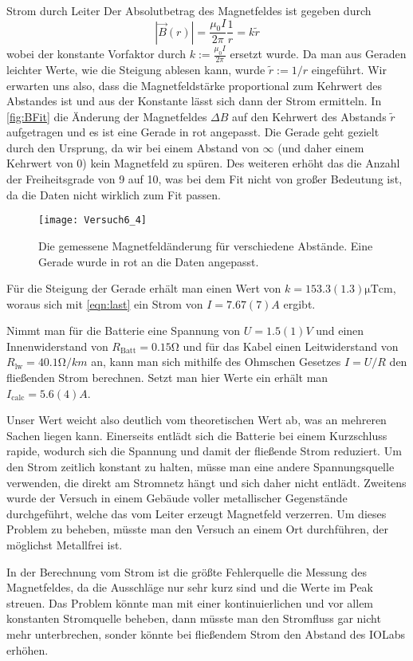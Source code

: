 \documentclass{alex_gp}
\begin{document}
\begin{mybox}{Strom durch Leiter}
	Der Absolutbetrag des Magnetfeldes ist gegeben durch 
	\begin{equation}\label{eqn:last}
		|\vec{B}(r)| = \frac{\mu_0 I}{2\pi}\frac{1}{r} = k\tilde{r}
	\end{equation}
	wobei der konstante Vorfaktor durch \( k := \tfrac{\mu_0 I}{2\pi} \) ersetzt wurde. Da man aus Geraden leichter Werte, wie die Steigung ablesen kann, wurde \( \tilde{r} := 1/r \) eingeführt. Wir erwarten uns also, dass die Magnetfeldstärke proportional zum Kehrwert des Abstandes ist und aus der Konstante lässt sich dann der Strom ermitteln. In \autoref{fig:BFit} die Änderung der Magnetfeldes \( \Delta B \) auf den Kehrwert des Abstands \( \tilde{r} \) aufgetragen und es ist eine Gerade in rot angepasst. Die Gerade geht gezielt durch den Ursprung, da wir bei einem Abstand von \( \infty \) (und daher einem Kehrwert von 0) kein Magnetfeld zu spüren. Des weiteren erhöht das die Anzahl der Freiheitsgrade von 9 auf 10, was bei dem Fit nicht von großer Bedeutung ist, da die Daten nicht wirklich zum Fit passen. 
	
	\begin{figure}[H]	
		\centering
		\texttt{[image: Versuch6\_4]}
		\caption{Die gemessene Magnetfeldänderung für verschiedene Abstände. Eine Gerade wurde in rot an die Daten angepasst.}
		\label{fig:BFit}
	\end{figure}

	Für die Steigung der Gerade erhält man einen Wert von \( k = 153.3(1.3) \unit{\micro\tesla\cm} \), woraus sich mit \autoref{eqn:last} ein Strom von \( I = 7.67(7) \unit{A} \) ergibt.
	
	Nimmt man für die Batterie eine Spannung von \( U = 1.5(1) \unit{V} \) und einen Innenwiderstand von \( R_{\text{Batt}} = 0.15 \unit{\ohm} \) und für das Kabel einen Leitwiderstand von \( R_{\text{lw}} = 40.1 \unit{\ohm/km} \) an, kann man sich mithilfe des Ohmschen Gesetzes \( I = U/R \) den fließenden Strom berechnen. Setzt man hier Werte ein erhält man \( I_{\text{calc}} = 5.6(4) \unit{A} \).
	
	Unser Wert weicht also deutlich vom theoretischen Wert ab, was an mehreren Sachen liegen kann. Einerseits entlädt sich die Batterie bei einem Kurzschluss rapide, wodurch sich die Spannung und damit der fließende Strom reduziert. Um den Strom zeitlich konstant zu halten, müsse man eine andere Spannungsquelle verwenden, die direkt am Stromnetz hängt und sich daher nicht entlädt. Zweitens wurde der Versuch in einem Gebäude voller metallischer Gegenstände durchgeführt, welche das vom Leiter erzeugt Magnetfeld verzerren. Um dieses Problem zu beheben, müsste man den Versuch an einem Ort durchführen, der möglichst Metallfrei ist. 
	
	In der Berechnung vom Strom ist die größte Fehlerquelle die Messung des Magnetfeldes, da die Ausschläge nur sehr kurz sind und die Werte im Peak streuen. Das Problem könnte man mit einer kontinuierlichen und vor allem konstanten Stromquelle beheben, dann müsste man den Stromfluss gar nicht mehr unterbrechen, sonder könnte bei fließendem Strom den Abstand des IOLabs erhöhen.
\end{mybox}
\end{document}

